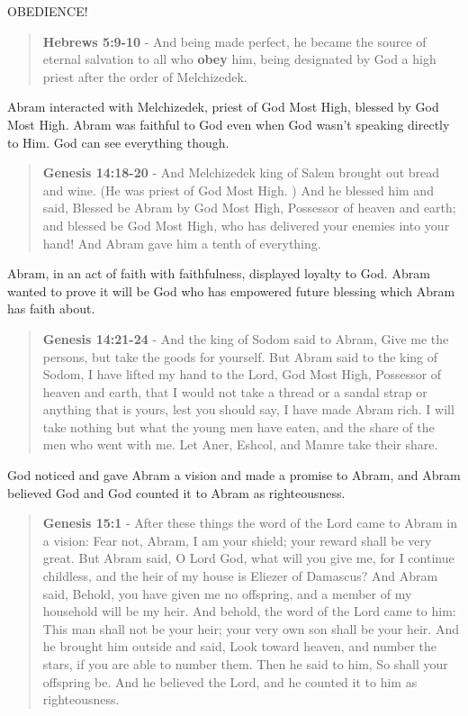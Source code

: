 \documentclass[11pt]{article}
\begin{document}
OBEDIENCE!

\begin{quote}
\textbf{Hebrews 5:9-10} - And being made perfect, he became the source of eternal salvation to all who \textbf{obey} him, being designated by God a high priest after the order of Melchizedek.
\end{quote}

Abram interacted with Melchizedek, priest of God Most High, blessed by God Most High. Abram was faithful to God even when God wasn't speaking directly to Him. God can see everything though.

\begin{quote}
\textbf{Genesis 14:18-20} - And Melchizedek king of Salem brought out bread and wine. (He was priest of God Most High. ) And he blessed him and said, Blessed be Abram by God Most High, Possessor of heaven and earth; and blessed be God Most High, who has delivered your enemies into your hand! And Abram gave him a tenth of everything.
\end{quote}

Abram, in an act of faith with faithfulness, displayed loyalty to God. Abram wanted to prove it will be God who has empowered future blessing which Abram has faith about.

\begin{quote}
\textbf{Genesis 14:21-24} - And the king of Sodom said to Abram, Give me the persons, but take the goods for yourself. But Abram said to the king of Sodom, I have lifted my hand to the Lord, God Most High, Possessor of heaven and earth, that I would not take a thread or a sandal strap or anything that is yours, lest you should say, I have made Abram rich. I will take nothing but what the young men have eaten, and the share of the men who went with me. Let Aner, Eshcol, and Mamre take their share.
\end{quote}

God noticed and gave Abram a vision and made a promise to Abram, and Abram believed God and God counted it to Abram as righteousness.

\begin{quote}
\textbf{Genesis 15:1} - After these things the word of the Lord came to Abram in a vision: Fear not, Abram, I am your shield; your reward shall be very great. But Abram said, O Lord God, what will you give me, for I continue childless, and the heir of my house is Eliezer of Damascus? And Abram said, Behold, you have given me no offspring, and a member of my household will be my heir. And behold, the word of the Lord came to him: This man shall not be your heir; your very own son shall be your heir. And he brought him outside and said, Look toward heaven, and number the stars, if you are able to number them. Then he said to him, So shall your offspring be. And he believed the Lord, and he counted it to him as righteousness.
\end{quote}
\end{document}
